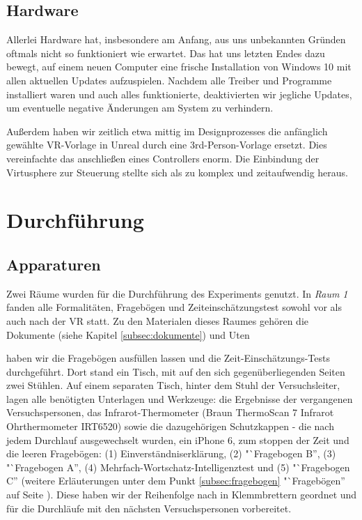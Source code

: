 \documentclass{Bericht}
\begin{document}
		
\label{subsec:hardware}
\subsection{Hardware}

			Allerlei Hardware hat, insbesondere am Anfang, aus uns unbekannten Gründen oftmals nicht so funktioniert wie erwartet. Das hat uns letzten Endes dazu bewegt, auf einem neuen Computer eine frische Installation von Windows 10 mit allen aktuellen Updates aufzuspielen. Nachdem alle Treiber und Programme installiert waren und auch alles funktionierte, deaktivierten wir jegliche Updates, um eventuelle negative Änderungen am System zu verhindern. 
			
			Außerdem haben wir zeitlich etwa mittig im Designprozesses die anfänglich gewählte VR-Vorlage in Unreal durch eine 3rd-Person-Vorlage ersetzt. Dies vereinfachte das anschließen eines Controllers enorm. Die Einbindung der Virtusphere zur Steuerung stellte sich als zu komplex und zeitaufwendig heraus. 
		

\section{Durchführung}
\subsection{Apparaturen}
Zwei Räume wurden für die Durchführung des Experiments genutzt. In  \textit{Raum 1} fanden alle Formalitäten, Fragebögen und Zeiteinschätzungstest sowohl vor als auch nach der VR statt. Zu den Materialen dieses Raumes gehören die Dokumente (siehe Kapitel \ref{subsec:dokumente}) und Uten

haben wir die Fragebögen ausfüllen lassen und die Zeit-Einschätzungs-Tests durchgeführt. Dort stand ein Tisch, mit auf den sich gegenüberliegenden Seiten zwei Stühlen. Auf einem separaten Tisch, hinter dem Stuhl der Versuchsleiter, lagen alle benötigten Unterlagen und Werkzeuge: die Ergebnisse der vergangenen Versuchspersonen, das Infrarot-Thermometer (Braun ThermoScan 7 Infrarot Ohrthermometer IRT6520) sowie die dazugehörigen Schutzkappen - die nach jedem Durchlauf ausgewechselt wurden, ein iPhone 6, zum stoppen der Zeit und die leeren Fragebögen: (1) Einverständniserklärung, (2)  "`Fragebogen B'', (3) "`Fragebogen A'', (4) Mehrfach-Wortschatz-Intelligenztest und (5) "`Fragebogen C'' (weitere Erläuterungen unter dem Punkt \ref{subsec:fragebogen} "`Fragebögen'' auf Seite \pageref{subsec:fragebogen}). Diese haben wir der Reihenfolge nach in Klemmbrettern geordnet und für die Durchläufe mit den nächsten Versuchspersonen vorbereitet. 
\end{document}
